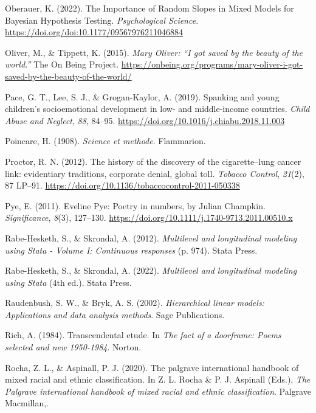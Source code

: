 \documentclass[
  letterpaper,
  DIV=11,
  numbers=noendperiod]{scrreprt}
\newlength{\cslhangindent}
\newenvironment{CSLReferences}[2] %
 {\begin{list}{}{%
  \setlength{\itemindent}{0pt}
  \setlength{\leftmargin}{0pt}
  \setlength{\parsep}{0pt}
  \ifodd #1
   \setlength{\leftmargin}{\cslhangindent}
   \setlength{\itemindent}{-1\cslhangindent}
  \fi
  \setlength{\itemsep}{#2\baselineskip}}}
 {\end{list}}
\begin{document}
\begin{CSLReferences}{1}{0}
Oberauer, K. (2022). {The Importance of Random Slopes in Mixed Models
for Bayesian Hypothesis Testing}. \emph{Psychological Science}.
\url{https://doi.org/doi:10.1177/09567976211046884}

Oliver, M., \& Tippett, K. (2015). \emph{{M}ary {O}liver: {``{I} got
saved by the beauty of the world.''}} The On Being Project.
\url{https://onbeing.org/programs/mary-oliver-i-got-saved-by-the-beauty-of-the-world/}

Pace, G. T., Lee, S. J., \& Grogan-Kaylor, A. (2019). {Spanking and
young children's socioemotional development in low- and middle-income
countries}. \emph{Child Abuse and Neglect}, \emph{88}, 84--95.
\url{https://doi.org/10.1016/j.chiabu.2018.11.003}

Poincare, H. (1908). \emph{Science et methode}. Flammarion.

Proctor, R. N. (2012). {The history of the discovery of the
cigarette--lung cancer link: evidentiary traditions, corporate denial,
global toll}. \emph{Tobacco Control}, \emph{21}(2), 87 LP--91.
\url{https://doi.org/10.1136/tobaccocontrol-2011-050338}

Pye, E. (2011). {E}veline {P}ye: Poetry in numbers, by {J}ulian
{C}hampkin. \emph{Significance}, \emph{8}(3), 127--130.
\url{https://doi.org/10.1111/j.1740-9713.2011.00510.x}

Rabe-Hesketh, S., \& Skrondal, A. (2012). \emph{Multilevel and
longitudinal modeling using {S}tata - {V}olume {I}: Continuous
responses} (p. 974). Stata Press.

Rabe-Hesketh, S., \& Skrondal, A. (2022). \emph{Multilevel and
longitudinal modeling using {S}tata} (4th ed.). Stata Press.

Raudenbush, S. W., \& Bryk, A. S. (2002). \emph{Hierarchical linear
models: Applications and data analysis methods}. Sage Publications.

Rich, A. (1984). Transcendental etude. In \emph{The fact of a doorframe:
Poems selected and new 1950-1984}. Norton.

Rocha, Z. L., \& Aspinall, P. J. (2020). The palgrave international
handbook of mixed racial and ethnic classification. In Z. L. Rocha \& P.
J. Aspinall (Eds.), \emph{The Palgrave international handbook of mixed
racial and ethnic classification}. Palgrave Macmillan,.


\end{CSLReferences}
\end{document}
